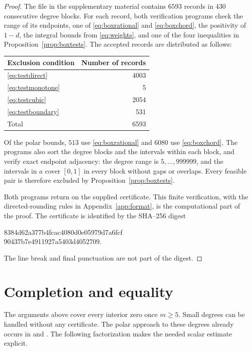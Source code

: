 \documentclass[11pt,letterpaper,reqno]{amsart}
\theoremstyle{definition}
\numberwithin{equation}{section}
\newcommand{\code}[1]{\texttt{\detokenize{#1}}}
\begin{document}
\begin{proof}
The file \code{certificate.json} in the supplementary material contains $6593$ records in $430$ consecutive degree blocks. For each record, both verification programs check the range of its endpoints, one of \eqref{eq:boxrational} and \eqref{eq:boxchord}, the positivity of $1-d$, the integral bounds from \eqref{eq:weights}, and one of the four inequalities in Proposition~\ref{prop:boxtests}. The accepted records are distributed as follows:
\begin{center}
\begin{tabular}{lr}
\toprule
Exclusion condition & Number of records\\
\midrule
\eqref{eq:testdirect} & 4003\\
\eqref{eq:testmonotone} & 5\\
\eqref{eq:testcubic} & 2054\\
\eqref{eq:testboundary} & 531\\
\midrule
Total & 6593\\
\bottomrule
\end{tabular}
\end{center}
Of the polar bounds, $513$ use \eqref{eq:boxrational} and $6080$ use \eqref{eq:boxchord}. The programs also sort the degree blocks and the intervals within each block, and verify exact endpoint adjacency: the degree range is $5,\ldots,999999$, and the intervals in $a$ cover $[0,1]$ in every block without gaps or overlaps. Every feasible pair is therefore excluded by Proposition~\ref{prop:boxtests}.

Both programs return \code{PASS} on the supplied certificate. This finite verification, with the directed-rounding rules in Appendix~\ref{app:format}, is the computational part of the proof. The certificate is identified by the SHA--256 digest
\begin{center}\small\ttfamily
8384d62a377b4fcac4080d0e05979d7a6fcf\\
90437b7e4911927a5403d4052709.
\end{center}
The line break and final punctuation are not part of the digest.
\end{proof}

\section{Completion and equality}\label{sec:completion}

The arguments above cover every interior zero once $m\ge5$. Small degrees can be handled without any certificate. The polar approach to these degrees already occurs in \cite[Section~8, pp.~16--17]{Maz26} and \cite[Section~4, Remark~16]{Tao26}. The following factorization makes the needed scalar estimate explicit.
\end{document}

